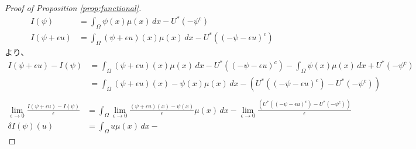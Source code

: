 \documentclass{jsarticle}
\theoremstyle{definition}
\begin{document}
\begin{proof}[Proof of Proposition \ref{prop:functional}]
    \begin{align*}
        I(\psi) &= \int_{\Omega} \psi(x) \mu(x) \,dx - U^*(- \psi^c)\\
        I(\psi + \epsilon u) &= \int_{\Omega} (\psi + \epsilon u)(x)\mu(x) \,dx - U^*((- \psi - \epsilon u)^c)
    \end{align*}
    より、
    \begin{align*}
        I(\psi + \epsilon u) -  I(\psi) &= \int_{\Omega} (\psi + \epsilon u)(x)\mu(x) \,dx - U^*((- \psi - \epsilon u)^c) - \int_{\Omega} \psi(x) \mu(x) \,dx + U^*(- \psi^c)\\
                                        &= \int_{\Omega} (\psi + \epsilon u)(x) - \psi(x) \mu(x) \,dx -\left( U^*((- \psi - \epsilon u)^c) - U^*(- \psi^c) \right)\\
    \end{align*}
    \begin{align*}
        \lim_{\epsilon \to 0} \frac{I(\psi + \epsilon u) -  I(\psi)}{\epsilon}    &= \int_{\Omega} \lim_{\epsilon \to 0} \frac{ (\psi + \epsilon u)(x) - \psi(x)}{\epsilon} \mu(x) \, dx - \lim_{\epsilon \to 0} \frac{\left( U^*((- \psi - \epsilon u)^c) - U^*(- \psi^c) \right)}{\epsilon}\\
                                                                \delta I(\psi)(u) &= \int_{\Omega} u \mu(x) \, dx - 
    \end{align*}
    
\end{proof}
\end{document}
